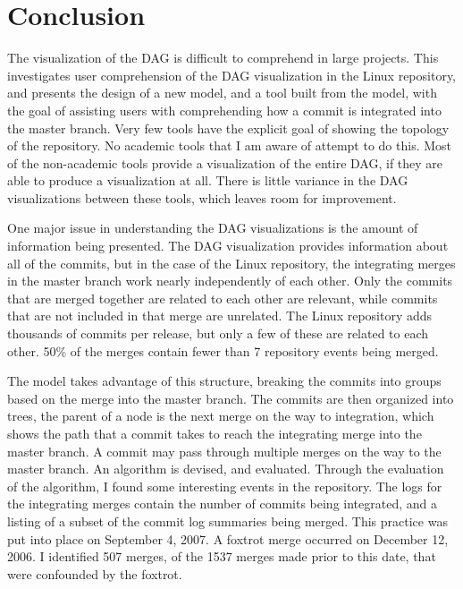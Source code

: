 \chapter{Conclusion}\label{chap:conclusion}

The visualization of the DAG is difficult to comprehend in large
projects. This \paper{} investigates user comprehension of the DAG
visualization in the Linux repository, and presents the design of a new
model, and a tool built from the model, with the goal of assisting users
with comprehending how a commit is integrated into the master branch.
Very few tools have the explicit goal of showing the topology of the
repository. No academic tools that I am aware of attempt to do this.
Most of the non-academic tools provide a visualization of the entire
DAG, if they are able to produce a visualization at all. There is little
variance in the DAG visualizations between these tools, which leaves
room for improvement.

One major issue in understanding the DAG visualizations is the amount of
information being presented. The DAG visualization provides information
about all of the commits, but in the case of the Linux repository, the
integrating merges in the master branch work nearly independently of
each other. Only the commits that are merged together are related to
each other are relevant, while commits that are not included in that
merge are unrelated. The Linux repository adds thousands of commits per
release, but only a few of these are related to each other. 50\% of the
merges contain fewer than 7 repository events being merged.

The \mt{} model takes advantage of this structure, breaking the commits
into groups based on the merge into the master branch. The commits are
then organized into trees, the parent of a node is the next merge on the
way to integration, which shows the path that a commit takes to reach
the integrating merge into the master branch.  A commit may pass through
multiple merges on the way to the master branch. An algorithm is
devised, and evaluated. Through the evaluation of the algorithm, I found
some interesting events in the repository. The logs for the integrating
merges contain the number of commits being integrated, and a listing of
a subset of the commit log summaries being merged. This practice was put
into place on September 4, 2007. A foxtrot merge occurred on December
12, 2006. I identified 507 merges, of the 1537 merges made prior to this
date, that were confounded by the foxtrot.

